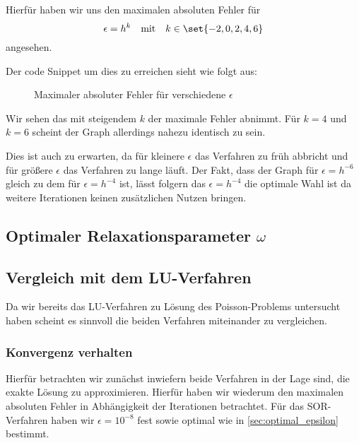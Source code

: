 \documentclass{scrartcl}
\theoremstyle{definition}
\begin{document}
Hierfür haben wir uns den maximalen absoluten Fehler für
\[
    \epsilon = h^k \quad \text{mit} \quad
    k \in \set{-2, 0, 2, 4, 6}
\]
angesehen.

Der code Snippet um dies zu erreichen sieht wie folgt aus:


\begin{figure}[H]
    \centering
    \caption{Maximaler absoluter Fehler für verschiedene \(\epsilon\)}
    \label{fig:optimal_epsilon}
\end{figure}

Wir sehen das mit steigendem \(k\) der maximale Fehler abnimmt. Für \(k = 4\)
und \(k = 6\) scheint der Graph allerdings nahezu identisch zu sein.

Dies ist auch zu erwarten, da für kleinere \(\epsilon\) das Verfahren zu früh
abbricht und für größere \(\epsilon\) das Verfahren zu lange läuft. Der Fakt,
dass der Graph für \(\epsilon = h^{-6}\) gleich zu dem für \(\epsilon =
h^{-4}\) ist, lässt folgern das \(\epsilon = h^{-4}\) die optimale Wahl ist da
weitere Iterationen keinen zusätzlichen Nutzen bringen.

\subsection{Optimaler Relaxationsparameter \(\omega\)}


\subsection{Vergleich mit dem LU-Verfahren}

Da wir bereits das LU-Verfahren zu Lösung des Poisson-Problems untersucht haben
scheint es sinnvoll die beiden Verfahren miteinander zu vergleichen.

\subsubsection{Konvergenz verhalten}

Hierfür betrachten wir zunächst inwiefern beide Verfahren in der Lage sind, die
exakte Lösung zu approximieren. Hierfür haben wir wiederum den maximalen
absoluten Fehler in Abhängigkeit der Iterationen betrachtet. Für das
SOR-Verfahren haben wir \(\epsilon = 10^{-8}\) fest sowie optimal wie in
\autoref{sec:optimal_epsilon} bestimmt.
\end{document}
